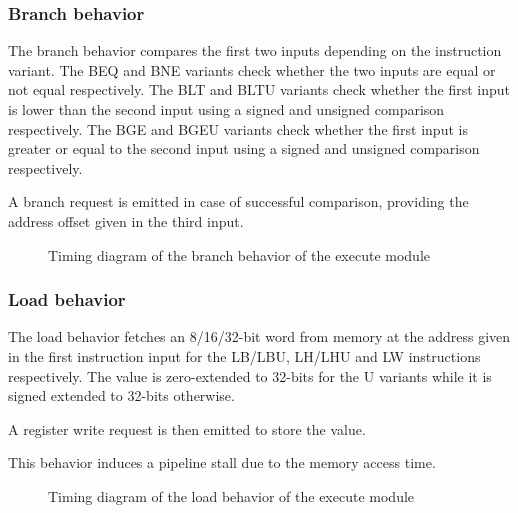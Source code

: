 \subsubsection{Branch behavior}

\begin{content}
    The branch behavior compares the first two inputs depending on the instruction variant. The BEQ and BNE variants check whether the two inputs are equal or not equal respectively. The BLT and BLTU variants check whether the first input is lower than the second input using a signed and unsigned comparison respectively. The BGE and BGEU variants check whether the first input is greater or equal to the second input using a signed and unsigned comparison respectively.
    
    A branch request is emitted in case of successful comparison, providing the address offset given in the third input.
\end{content}

\begin{figure}[H]
    \centering
    
    \caption{Timing diagram of the branch behavior of the execute module}
    \label{fig:exm-behavior-branch}
\end{figure}



\subsubsection{Load behavior}

\begin{content}
    The load behavior fetches an 8/16/32-bit word from memory at the address given in the first instruction input for the LB/LBU, LH/LHU and LW instructions respectively. The value is zero-extended to 32-bits for the U variants while it is signed extended to 32-bits otherwise. 
    
    A register write request is then emitted to store the value. 
    
    This behavior induces a pipeline stall due to the memory access time.
\end{content}

\begin{figure}[H]
    \centering
    
    \caption{Timing diagram of the load behavior of the execute module}
    \label{fig:exm-behavior-load}
\end{figure}


